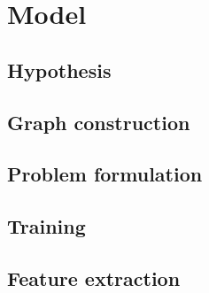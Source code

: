 \documentclass[a4paper,12pt,twoside]{report}
\begin{document}
\chapter{Model}

\section{Hypothesis}




\section{Graph construction}

\section{Problem formulation}

\section{Training}

\section{Feature extraction}
\end{document}
